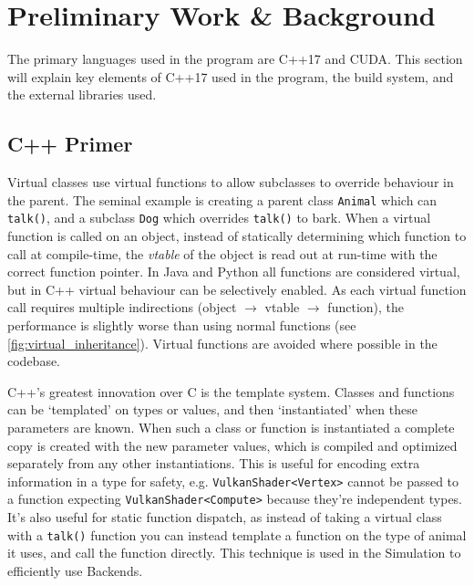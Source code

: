 \section{Preliminary Work \& Background}
The primary languages used in the program are C++17 and CUDA.
This section will explain key elements of C++17 used in the program, the build system, and the external libraries used.

\subsection{C++ Primer}
Virtual classes use virtual functions to allow subclasses to override behaviour in the parent.
The seminal example is creating a parent class \texttt{Animal} which can \texttt{talk()}, and a subclass \texttt{Dog} which overrides \texttt{talk()} to bark.
When a virtual function is called on an object, instead of statically determining which function to call at compile-time, the \emph{vtable} of the object is read out at run-time with the correct function pointer\cite{presentation:RuntimePolymorphism}.
In Java and Python all functions are considered virtual, but in C++ virtual behaviour can be selectively enabled.
As each virtual function call requires multiple indirections (object $\rightarrow$ vtable $\rightarrow$ function), the performance is slightly worse than using normal functions (see \cref{fig:virtual_inheritance}).
Virtual functions are avoided where possible in the codebase.



C++'s greatest innovation over C is the template system.
Classes and functions can be `templated' on types or values, and then `instantiated' when these parameters are known.
When such a class or function is instantiated a complete copy is created with the new parameter values, which is compiled and optimized separately from any other instantiations.
This is useful for encoding extra information in a type for safety, e.g. \texttt{VulkanShader<Vertex>} cannot be passed to a function expecting \texttt{VulkanShader<Compute>} because they're independent types.
It's also useful for static function dispatch, as instead of taking a virtual class with a \texttt{talk()} function you can instead template a function on the type of animal it uses, and call the function directly.
This technique is used in the Simulation to efficiently use Backends.


